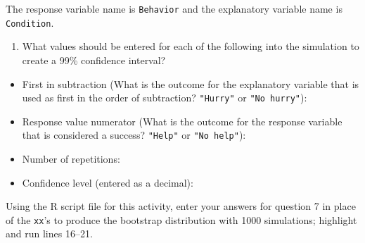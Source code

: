 \documentclass[
]{report}
\providecommand{\tightlist}{%
  \setlength{\itemsep}{0pt}\setlength{\parskip}{0pt}}
\begin{document}
The response variable name is \texttt{Behavior} and the explanatory variable name is \texttt{Condition}.

\begin{enumerate}
\def\labelenumi{\arabic{enumi}.}
\setcounter{enumi}{6}
\tightlist
\item
  What values should be entered for each of the following into the simulation to create a 99\% confidence interval?
  \vspace{.5mm}
\end{enumerate}

\begin{itemize}
\tightlist
\item
  First in subtraction (What is the outcome for the explanatory variable that is used as first in the order of subtraction? \texttt{"Hurry"} or \texttt{"No\ hurry"}):
\end{itemize}

\vspace{.15in}

\begin{itemize}
\tightlist
\item
  Response value numerator (What is the outcome for the response variable that is considered a success? \texttt{"Help"} or \texttt{"No\ help"}):
\end{itemize}

\vspace{.15in}

\begin{itemize}
\tightlist
\item
  Number of repetitions:
\end{itemize}

\vspace{.15in}

\begin{itemize}
\tightlist
\item
  Confidence level (entered as a decimal):
\end{itemize}

\vspace{.15in}

Using the R script file for this activity, enter your answers for question 7 in place of the \texttt{xx}'s to produce the bootstrap distribution with 1000 simulations; highlight and run lines 16--21.
\end{document}
